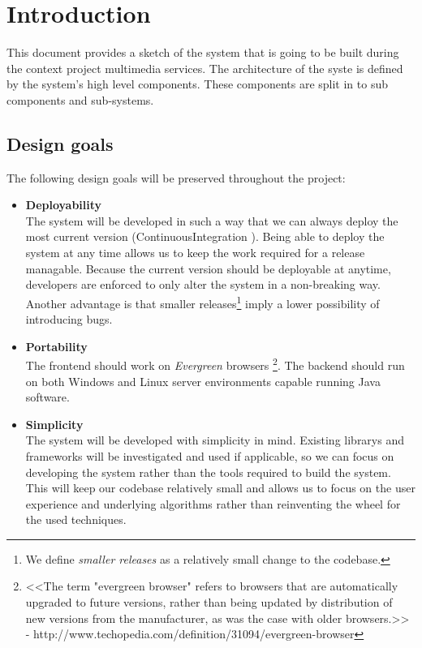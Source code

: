 \chapter{Introduction}
This document provides a sketch of the system that is going to be built during the context project multimedia services. The architecture of the syste is defined by the system's high level components. These components are split in to sub components and sub-systems.

\section{Design goals}
The following design goals will be preserved throughout the project:
\begin{itemize}

\item
\textbf{Deployability}
\\
The system will be developed in such a way that we can always deploy the most current version (\gls{ContinuousIntegration} \cite{Duvall}).
Being able to deploy the system at any time allows us to keep the work required for a release managable.
Because the current version should be deployable at anytime, developers are enforced to only alter the system in a non-breaking way.
Another advantage is that smaller releases\footnote{We define \textit{smaller releases} as a relatively small change to the codebase.} imply a lower possibility of introducing bugs.

\item
\textbf{Portability}
\\
The frontend should work on \textit{Evergreen} browsers \footnote{<<The term "evergreen browser" refers to browsers that are automatically upgraded to future versions, rather than being updated by distribution of new versions from the manufacturer, as was the case with older browsers.>> - http://www.techopedia.com/definition/31094/evergreen-browser}.
The backend should run on both Windows and Linux server environments capable running Java software.

\item
\textbf{Simplicity}
\\
The system will be developed with simplicity in mind.
Existing \glspl{library} and \glspl{framework} will be investigated and used if applicable, so we can focus on developing the system rather than the tools required to build the system.
This will keep our codebase relatively small and allows us to focus on the user experience and underlying algorithms rather than reinventing the wheel for the used techniques.


\end{itemize}
